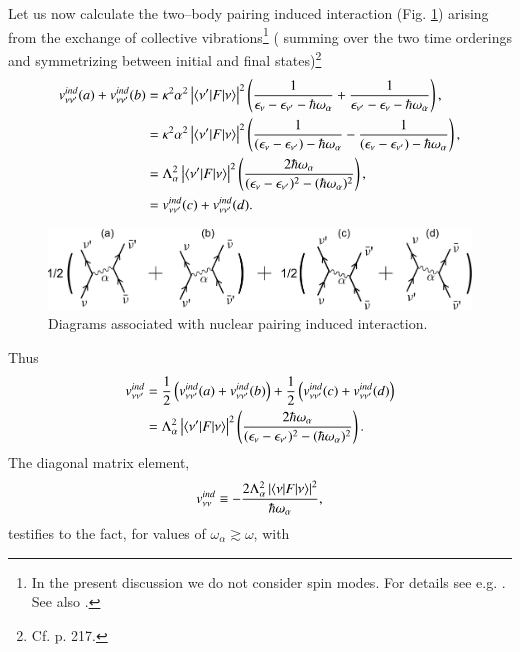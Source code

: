 \begin{subappendices}
Let us now calculate the two--body pairing induced interaction (Fig. \ref{fig3.A.2}) arising from the exchange of collective vibrations\footnote{In the present discussion we do not consider spin modes. For details see e.g. \cite{Idini:15}. See also \cite{Bortignon:83}.} ( summing over the two time orderings and symmetrizing between initial and final states)\footnote{Cf. \cite{Brink:05} p. 217.}
\begin{align}
\nonumber v_{\nu\nu'}^{ind}(a)+v_{\nu\nu'}^{ind}(b)&=\kappa^2\alpha^2\left|\langle {\nu'|F|\nu} \rangle\right|^2\left(\frac{1}{\epsilon_\nu-\epsilon_{\nu'}-\hbar\omega_\alpha}+\frac{1}{\epsilon_{\nu'}-\epsilon_{\nu}-\hbar\omega_\alpha}\right),\\
\nonumber &=\kappa^2\alpha^2\left|\langle {\nu'|F|\nu} \rangle\right|^2\left(\frac{1}{(\epsilon_\nu-\epsilon_{\nu'})-\hbar\omega_\alpha}-\frac{1}{(\epsilon_{\nu}-\epsilon_{\nu'})-\hbar\omega_\alpha}\right),\\
\nonumber &=\Lambda_\alpha^2\left|\langle {\nu'|F|\nu} \rangle\right|^2\left(\frac{2\hbar\omega_\alpha}{(\epsilon_\nu-\epsilon_{\nu'})^2-(\hbar\omega_\alpha)^2}\right),\\
&=v_{\nu\nu'}^{ind}(c)+v_{\nu\nu'}^{ind}(d).
\end{align}
   \begin{figure}
   \centerline{\includegraphics*[width=12cm,angle=0	]{nutshell/figs/fig3_A_2}}
   \caption{Diagrams associated with nuclear pairing induced interaction.}\label{fig3.A.2}
   \end{figure}
Thus
\begin{align}\label{eq3.A.17}
\nonumber v_{\nu\nu'}^{ind}&=\frac{1}{2}\left(v_{\nu\nu'}^{ind}(a)+v_{\nu\nu'}^{ind}(b)\right)+\frac{1}{2}\left(v_{\nu\nu'}^{ind}(c)+v_{\nu\nu'}^{ind}(d)\right)\\ &=\Lambda_\alpha^2\left|\langle {\nu'|F|\nu} \rangle\right|^2\left(\frac{2\hbar\omega_\alpha}{(\epsilon_\nu-\epsilon_{\nu'})^2-(\hbar\omega_\alpha)^2}\right).
\end{align}
The diagonal matrix element,
\begin{align}
\nonumber v_{\nu\nu}^{ind}\equiv-\frac{2\Lambda_\alpha^2\left|\langle {\nu|F|\nu} \rangle\right|^2}{\hbar\omega_\alpha},
\end{align}
testifies to the fact, for values of $\omega_\alpha\gtrsim\omega$, with

\end{subappendices}

